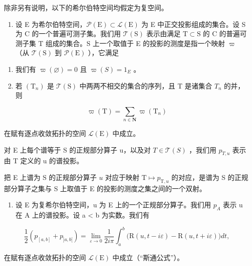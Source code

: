 \exercisesection{}

除非另有说明，以下的希尔伯特空间均假定为复空间。

\begin{enumerate}
\def\labelenumi{\arabic{enumi})}
\tightlist
\item
  设 E 为希尔伯特空间，\(\mathcal{P}(\mathrm{E})\subset \mathcal{L}(\mathrm{E})\) 为 E 中正交投影组成的集合。设 S 为 C 的一个普遍可测子集。我们用 \(\mathcal{T}(\mathrm{S})\) 表示由满足 \(\mathrm{T}\subset \mathrm{S}\) 的 C 的普遍可测子集 T 组成的集合。S 上一个取值于 E 的投影的测度是指一个映射 \(\varpi\) （从 \(\mathcal{T}(\mathrm{S})\) 到 \(\mathcal{P}(\mathrm{E})\) ），它满足
\end{enumerate}

\begin{enumerate}
\def\labelenumi{(\roman{enumi})}
\item
  我们有 \(\varpi(\varnothing)=0\) 且 \(\varpi(S)=1_{E}\) 。
\item
  若 \((\mathrm{T}_{n})\) 是 \(\mathcal{T}(\mathrm{S})\) 中两两不相交的集合的序列，且 T 是诸集合 \(T_{n}\) 的并，则
\end{enumerate}

\[
\varpi (\mathrm{T}) = \sum_ {n \in \mathbf {N}} \varpi (\mathrm{T} _ {n})
\]

在赋有逐点收敛拓扑的空间 \(\mathcal{L}(\mathrm{E})\) 中成立。

对 E 上每个谱等于 S 的正规部分算子 u，以及对 \(T \in \mathcal{T}(S)\) ，我们用 \(p_{T,u}\) 表示由 T 定义的 u 的谱投影。

把 E 上谱为 S 的正规部分算子 \(u\) 对应于映射 \(\mathrm{T} \mapsto p_{\mathrm{T}, u}\) 的对应，是谱为 S 的正规部分算子之集与 S 上取值于 E 的投影的测度之集之间的一个双射。

\begin{enumerate}
\def\labelenumi{\arabic{enumi})}
\setcounter{enumi}{1}
\tightlist
\item
  设 E 为复希尔伯特空间，u 为 E 上的一个正规部分算子。我们用 \(p_{A}\) 表示 u 在 A 上的谱投影。设 a \textless{} b 为实数。我们有
\end{enumerate}

\[
\frac {1}{2} (p _ {[ a, b ]} + p _ {] a, b [}) = \lim _ {\varepsilon \rightarrow 0} \frac {1}{2 i \pi} \int_ {a} ^ {b} \big (\mathrm{R} (u, t - i \varepsilon) - \mathrm{R} (u, t + i \varepsilon) \big) d t,
\]

在赋有逐点收敛拓扑的空间 \(\mathcal{L}(\mathrm{E})\) 中成立（“斯通公式”）。

